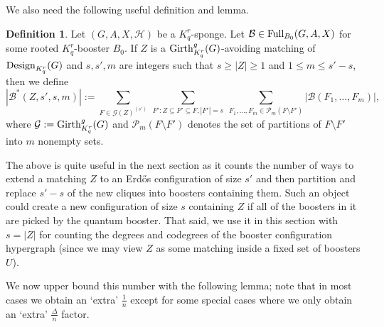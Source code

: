 \documentclass[11pt]{article}
\newcommand{\mc}[1]{\mathcal{#1}}
\newcounter{i}
\theoremstyle{plain}
\theoremstyle{plain} %
\theoremstyle{definition}
\newtheorem{definition}[thm]{Definition}
\begin{document}
We also need the following useful definition and lemma.

\begin{definition}
Let $(G,A,X,\mc{H})$ be a $K_q^r$-sponge. Let $\mc{B} \in {\rm Full}_{B_0}(G,A,X)$ for some rooted $K_q^r$-booster $B_0$. If $Z$ is a ${\rm Girth}_{K_q^r}^g(G)$-avoiding matching of ${\rm Design}_{K_q^r}(G)$ and $s, s', m$ are integers such that $s \ge |Z|\ge 1$ and $1\le m\le s'-s$, then we define
$$|\mc{B}^{*}(Z,s',s,m)|:= \sum_{F\in \mc{G}(Z)^{(s')}}~\sum_{F': Z\subseteq F' \subseteq F, |F'|=s}~\sum_{F_1,\ldots, F_{m}\in \mc{P}_{m}(F\setminus F')} |\mc{B}(F_1,\ldots, F_{m})|,$$
where $\mc{G}:= {\rm Girth}_{K_q^r}^g(G)$ and $\mc{P}_m(F\setminus F')$ denotes the set of partitions of $F\setminus F'$ into $m$ nonempty sets.
\end{definition}

The above is quite useful in the next section as it counts the number of ways to extend a matching $Z$ to an Erd\H{o}s configuration of size $s'$ and then partition and replace $s'-s$ of the new cliques into boosters containing them. Such an object could create a new configuration of size $s$ containing $Z$ if all of the boosters in it are picked by the quantum booster. That said, we use it in this section with $s=|Z|$ for counting the degrees and codegrees of the booster configuration hypergraph (since we may view $Z$ as some matching inside a fixed set of boosters $U$).

We now upper bound this number with the following lemma; note that in most cases we obtain an `extra' $\frac{1}{n}$ except for some special cases where we only obtain an `extra' $\frac{\Delta}{n}$ factor.
\end{document}
